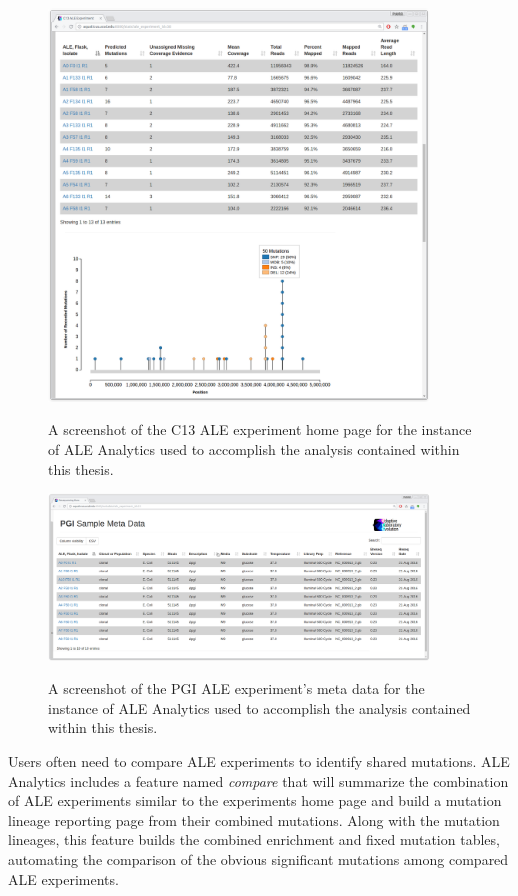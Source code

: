 \documentclass[12pt,final,masters,chapterheads]{ucsd}  %
\begin{document}
\begin{figure}[H]
  \caption{A screenshot of the C13 ALE experiment home page for the instance of ALE Analytics used to accomplish the analysis contained within this thesis.}
  \centering
  \includegraphics[width=0.9\textwidth]{experiment_stats_page.png}
  \label{fig:experiment_stats_page}
\end{figure}
\begin{figure}[H]
  \caption{A screenshot of the PGI ALE experiment's meta data for the instance of ALE Analytics used to accomplish the analysis contained within this thesis.}
  \centering
  \includegraphics[width=0.9\textwidth]{metadata_page.png}
  \label{fig:metadata_page}
\end{figure}
Users often need to compare ALE experiments to identify shared mutations. ALE Analytics includes a feature named \textit{compare} that will summarize the combination of ALE experiments similar to the experiments home page and build a mutation lineage reporting page from their combined mutations. Along with the mutation lineages, this feature builds the combined enrichment and fixed mutation tables, automating the comparison of the obvious significant mutations among compared ALE experiments.
\end{document}

